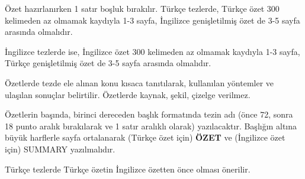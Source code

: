 Özet hazırlanırken 1 satır boşluk bırakılır. Türkçe tezlerde, Türkçe özet 300 kelimeden
az olmamak kaydıyla 1-3 sayfa, İngilizce genişletilmiş özet de 3-5 sayfa arasında olmalıdır.

İngilizce tezlerde ise, İngilizce özet 300 kelimeden az olmamak kaydıyla 1-3 sayfa, Türkçe genişletilmiş özet de 3-5 sayfa arasında olmalıdır.

Özetlerde tezde ele alınan konu kısaca tanıtılarak, kullanılan yöntemler ve ulaşılan sonuçlar belirtilir. Özetlerde kaynak, şekil, çizelge verilmez.

Özetlerin başında, birinci dereceden başlık formatında tezin adı (önce 72, sonra 18  punto  aralık  bırakılarak  ve  1  satır  aralıklı  olarak)  yazılacaktır.   Başlığın  altına büyük harflerle sayfa ortalanarak (Türkçe özet için) \textbf{ÖZET} ve (İngilizce özet için) SUMMARY yazılmalıdır.

Türkçe tezlerde Türkçe özetin İngilizce özetten önce olması önerilir.



